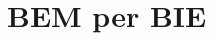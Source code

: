 \documentclass[a4paper]{article}
\theoremstyle{definition}
\theoremstyle{plain}
\theoremstyle{remark}
\begin{document}
%	
	
	\section{BEM per BIE}
	
	
%	
%	
%	
	
\end{document}
